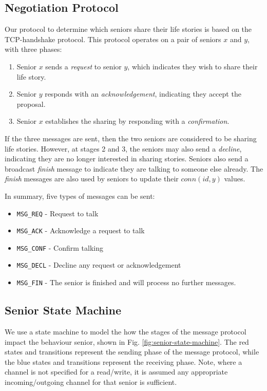 \documentclass[12pt,a4paper]{scrartcl}
\begin{document}
\subsection{Negotiation Protocol}
Our protocol to determine which seniors share their life stories is based on the TCP-handshake protocol.
This protocol operates on a pair of seniors $x$ and $y$, with three phases:
\begin{enumerate}
    \item Senior $x$ sends a \emph{request} to senior $y$, which indicates they wish to share their life story.
    \item Senior $y$ responds with an \emph{acknowledgement}, indicating they accept the proposal.
    \item Senior $x$ establishes the sharing by responding with a \emph{confirmation}.
\end{enumerate}

If the three messages are sent, then the two seniors are considered to be sharing life stories.
However, at stages 2 and 3, the seniors may also send a \emph{decline}, indicating they are no longer interested in sharing stories.
Seniors also send a broadcast \emph{finish} message to indicate they are talking to someone else already.
The \emph{finish} messages are also used by seniors to update their $conn(id,y)$ values.

In summary, five types of messages can be sent:
\begin{itemize}
    \item \texttt{MSG\_REQ} - Request to talk
    \item \texttt{MSG\_ACK} - Acknowledge a request to talk
    \item \texttt{MSG\_CONF} - Confirm talking
    \item \texttt{MSG\_DECL} - Decline any request or acknowledgement
    \item \texttt{MSG\_FIN} - The senior is finished and will process no further messages.
\end{itemize}

\subsection{Senior State Machine}
We use a state machine to model the how the stages of the message protocol impact the behaviour senior, shown in Fig. \ref{fig:senior-state-machine}.
The red states and transitions represent the sending phase of the message protocol, while the blue states and transitions represent the receiving phase.
Note, where a channel is not specified for a read/write, it is assumed any appropriate incoming/outgoing channel for that senior is sufficient.
\end{document}
